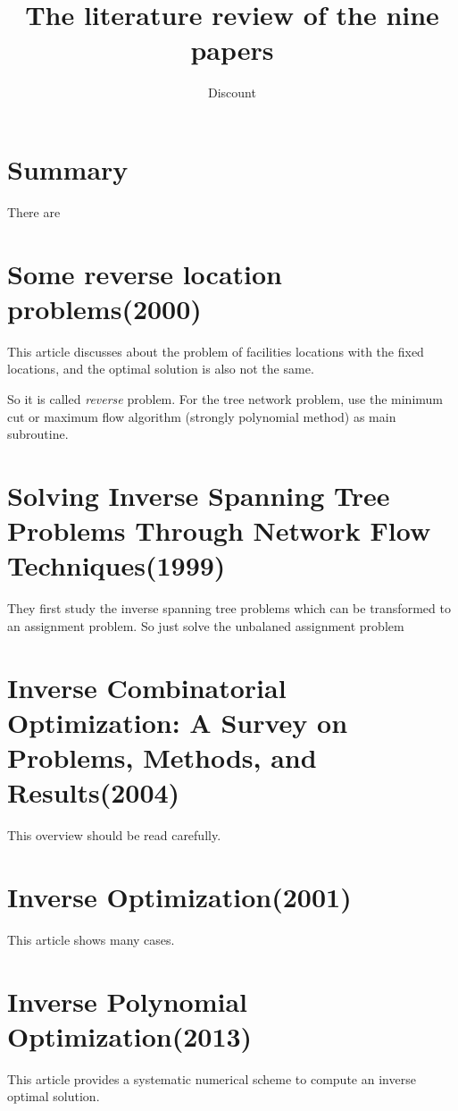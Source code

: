 \documentclass[UTF8]{article}
\title{The literature review of the nine papers}
\author{Dis\cdot count}
\begin{document}
\maketitle{}

\section{Summary}

There are

\section{Some reverse location problems(2000)}

This article discusses about the problem of facilities locations with the fixed locations, and the optimal solution is also not the same.

So it is called \emph{reverse} problem. For the tree network problem, use the minimum cut or maximum flow algorithm (strongly polynomial method) as main subroutine.


\section{Solving Inverse Spanning Tree Problems Through Network Flow Techniques(1999)}

They ﬁrst study the inverse spanning tree problems which can be transformed to an assignment problem. So just solve the unbalaned assignment problem


\section{Inverse Combinatorial Optimization: A Survey on Problems, Methods, and Results(2004)}

This overview should be read carefully.



\section{Inverse Optimization(2001)}

This article shows many cases.

\section{Inverse Polynomial Optimization(2013)}


This article provides a systematic numerical scheme to compute an inverse optimal solution.
\end{document}
